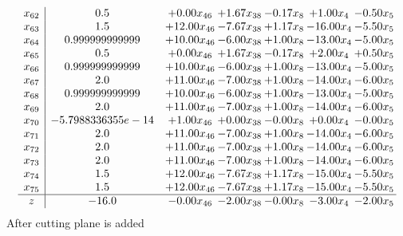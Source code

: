 \documentclass[8pt]{article}
\begin{document}
\[\begin{array}{c| c c@{\hskip 2pt} c@{\hskip 2pt} c@{\hskip 2pt} c@{\hskip 2pt} c@{\hskip 2pt} }
 x_{62}   &  0.5 & +  0.00 x_{46} & +  1.67 x_{38} & -0.17 x_{8} & +  1.00 x_{4} & -0.50 x_{5}\\
 x_{63}   &  1.5 & + 12.00 x_{46} & -7.67 x_{38} & +  1.17 x_{8} & -16.00 x_{4} & -5.50 x_{5}\\
 x_{64}   &  0.999999999999 & + 10.00 x_{46} & -6.00 x_{38} & +  1.00 x_{8} & -13.00 x_{4} & -5.00 x_{5}\\
 x_{65}   &  0.5 & +  0.00 x_{46} & +  1.67 x_{38} & -0.17 x_{8} & +  2.00 x_{4} & +  0.50 x_{5}\\
 x_{66}   &  0.999999999999 & + 10.00 x_{46} & -6.00 x_{38} & +  1.00 x_{8} & -13.00 x_{4} & -5.00 x_{5}\\
 x_{67}   &  2.0 & + 11.00 x_{46} & -7.00 x_{38} & +  1.00 x_{8} & -14.00 x_{4} & -6.00 x_{5}\\
 x_{68}   &  0.999999999999 & + 10.00 x_{46} & -6.00 x_{38} & +  1.00 x_{8} & -13.00 x_{4} & -5.00 x_{5}\\
 x_{69}   &  2.0 & + 11.00 x_{46} & -7.00 x_{38} & +  1.00 x_{8} & -14.00 x_{4} & -6.00 x_{5}\\
 x_{70}   &  -5.7988336355e-14 & +  1.00 x_{46} & +  0.00 x_{38} & -0.00 x_{8} & +  0.00 x_{4} & -0.00 x_{5}\\
 x_{71}   &  2.0 & + 11.00 x_{46} & -7.00 x_{38} & +  1.00 x_{8} & -14.00 x_{4} & -6.00 x_{5}\\
 x_{72}   &  2.0 & + 11.00 x_{46} & -7.00 x_{38} & +  1.00 x_{8} & -14.00 x_{4} & -6.00 x_{5}\\
 x_{73}   &  2.0 & + 11.00 x_{46} & -7.00 x_{38} & +  1.00 x_{8} & -14.00 x_{4} & -6.00 x_{5}\\
 x_{74}   &  1.5 & + 12.00 x_{46} & -7.67 x_{38} & +  1.17 x_{8} & -15.00 x_{4} & -5.50 x_{5}\\
 x_{75}   &  1.5 & + 12.00 x_{46} & -7.67 x_{38} & +  1.17 x_{8} & -15.00 x_{4} & -5.50 x_{5}\\
\hline
z    &  -16.0 & -0.00 x_{46} & -2.00 x_{38} & -0.00 x_{8} & -3.00 x_{4} & -2.00 x_{5}\\
\end{array}\]
 After cutting plane is added 
\end{document}

